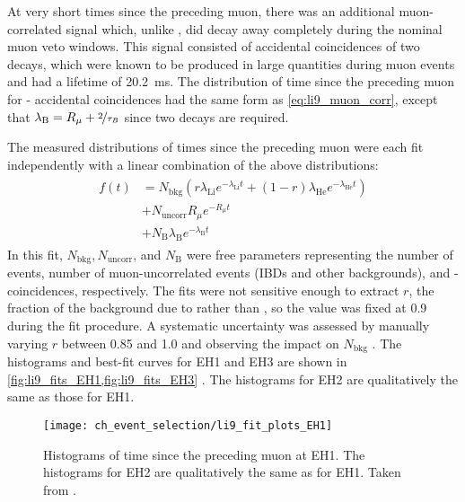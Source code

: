 At very short times since the preceding muon,
there was an additional muon-correlated signal
which, unlike \li{}, did decay away completely
during the nominal muon veto windows.
This signal consisted of accidental coincidences
of two \boron{} decays,
which were known to be produced in large quantities
during muon events \cite{kamland_li9}
and had a lifetime of \SI{20.2}{\ms}.
The distribution of time since the preceding muon
for \boron{}-\boron{} accidental coincidences
had the same form as \cref{eq:li9_muon_corr},
except that $\lambda_\text{B} = R_\mu + \nicefrac{2}{\tau_{B}}$
since two \boron{} decays are required.

The measured distributions of times since the preceding muon
were each fit independently with a linear combination of the above distributions:
\begin{align}\label{eq:li9_fit_fn}
    \begin{split}
        f(t) &= N_\text{bkg} (r \lambda_\text{Li} e^{-\lambda_\text{Li} t}
        + (1-r) \lambda_\text{He} e^{-\lambda_\text{He} t}) \\
             &+ N_\text{uncorr} R_\mu e^{-R_\mu t} \\
             &+ N_\text{B} \lambda_\text{B} e^{-\lambda_\text{B} t}
    \end{split}
\end{align}
In this fit, $N_\text{bkg}, N_\text{uncorr}$, and $N_\text{B}$
were free parameters representing the number of \li{} events,
number of muon-uncorrelated events (IBDs and other backgrounds),
and \boron{}-\boron{} coincidences, respectively.
The fits were not sensitive enough to extract $r$,
the fraction of the background due to \li{} rather than \he{},
so the value was fixed at 0.9 during the fit procedure.
A systematic uncertainty was assessed by manually varying $r$
between 0.85 and 1.0
and observing the impact on $N_\text{bkg}$ \cite{li9_details}.
The histograms and best-fit curves for EH1 and EH3 are shown
in \cref{fig:li9_fits_EH1,fig:li9_fits_EH3} \cite{jinjing_2020may}.
The histograms for EH2 are qualitatively the same as those for EH1.

\begin{figure}
    \centering
    \texttt{[image: ch\_event\_selection/li9\_fit\_plots\_EH1]}
    \caption{
        Histograms of time since the preceding muon at EH1.
        The histograms for EH2 are qualitatively the same as for EH1.
        Taken from \cite{jinjing_2020may}.
    }
    \label{fig:li9_fits_EH1}
\end{figure}

